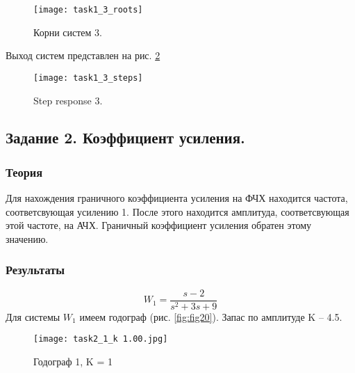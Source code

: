 \documentclass[16pt]{article}
\begin{document}
\begin{figure}[h!]
    \centering
    \texttt{[image: task1\_3\_roots]}
    \caption{Корни систем 3.}
    \label{fig:fig8}
\end{figure}

Выход систем представлен на рис. \ref*{fig:fig9}

\begin{figure}[h!]
    \centering
    \texttt{[image: task1\_3\_steps]}
    \caption{Step response 3.}
    \label{fig:fig9}
\end{figure}

\newpage





























\subsection{Задание 2. Коэффициент усиления.}
\subsubsection{Теория}
Для нахождения граничного коэффициента усиления на ФЧХ находится частота, соответсвующая усилению 1. После этого находится амплитуда, соответсвующая этой частоте, на АЧХ. Граничный коэффициент усиления обратен этому значению.


\subsubsection{Результаты}
\[W_1 = \frac{s-2}{s^2+3s+9}\]
Для системы \(W_1\) имеем годограф (рис. \ref*{fig:fig20}). Запас по амплитуде K -- 4.5.
\begin{figure}[h!]
    \centering
    \texttt{[image: task2\_1\_k 1.00.jpg]}
    \caption{Годограф 1, K = 1}
    \label{fig:fig10}
\end{figure}
\end{document}
